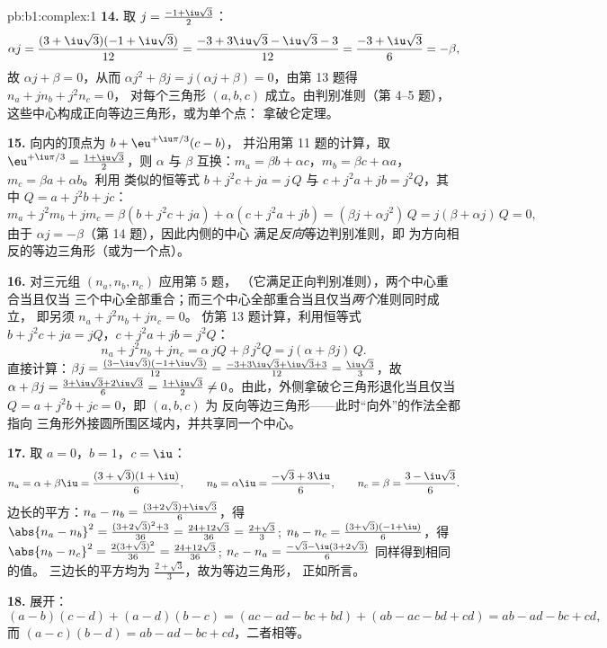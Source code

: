 \begin{solution}{pb:b1:complex:1}
\textbf{14.} 取 $j = \frac{-1 + \iu\sqrt3}2$：
\[
\alpha j = \frac{(3 + \iu\sqrt3)(-1 + \iu\sqrt3)}{12}
= \frac{-3 + 3\iu\sqrt3 - \iu\sqrt3 - 3}{12}
= \frac{-3 + \iu\sqrt3}6 = -\beta ,
\]
故 $\alpha j + \beta = 0$，从而 $\alpha j^2 + \beta j = j(\alpha j
+ \beta) = 0$，由第 13 题得 $n_a + jn_b + j^2n_c = 0$，
对每个三角形 $(a, b, c)$ 成立。由判别准则（第 4--5 题），
这些中心构成正向等边三角形，或为单个点：
拿破仑定理。

\textbf{15.} 向内的顶点为 $b + \eu^{+\iu\pi/3}(c - b)$，
并沿用第 11 题的计算，取 $\eu^{+\iu\pi/3} = \frac{1 +
\iu\sqrt3}2$，则 $\alpha$ 与 $\beta$ 互换：$m_a = \beta b + \alpha
c$，$m_b = \beta c + \alpha a$，$m_c = \beta a + \alpha b$。利用
类似的恒等式 $b + j^2c + ja = j\,Q$ 与 $c + j^2a + jb
= j^2 Q$，其中 $Q = a + j^2b + jc$：
\[
m_a + j^2 m_b + j m_c
= \beta(b + j^2 c + ja) + \alpha(c + j^2 a + jb)
= (\beta j + \alpha j^2)\, Q = j(\beta + \alpha j)\,Q = 0 ,
\]
由于 $\alpha j = -\beta$（第 14 题），因此内侧的中心
满足\emph{反向}等边判别准则，即
为方向相反的等边三角形（或为一个点）。

\textbf{16.} 对三元组 $(n_a, n_b, n_c)$ 应用第 5 题，
（它满足正向判别准则），两个中心重合当且仅当
三个中心全部重合；而三个中心全部重合当且仅当\emph{两个}准则同时成立，
即另须 $n_a + j^2 n_b + j n_c = 0$。
仿第 13 题计算，利用恒等式 $b + j^2c + ja = jQ$，$c + j^2a +
jb = j^2Q$：
\[
n_a + j^2 n_b + j n_c
= \alpha\,jQ + \beta\,j^2 Q = j(\alpha + \beta j)\,Q .
\]
直接计算：$\beta j = \frac{(3 -
\iu\sqrt3)(-1 + \iu\sqrt3)}{12} = \frac{-3 + 3\iu\sqrt3 +
\iu\sqrt3 + 3}{12} = \frac{\iu\sqrt3}3$，故 $\alpha + \beta j =
\frac{3 + \iu\sqrt3 + 2\iu\sqrt3}6 = \frac{1 + \iu\sqrt3}2 \neq
0$。由此，外侧拿破仑三角形退化当且仅当 $Q = a +
j^2b + jc = 0$，即 $(a, b, c)$ 为
反向等边三角形——此时“向外”的作法全都指向
三角形外接圆所围区域内，并共享同一个中心。

\textbf{17.} 取 $a = 0$，$b = 1$，$c = \iu$：
\[
n_a = \alpha + \beta\iu = \frac{(3 + \sqrt3)(1 + \iu)}6,
\qquad
n_b = \alpha\iu = \frac{-\sqrt3 + 3\iu}6,
\qquad
n_c = \beta = \frac{3 - \iu\sqrt3}6 .
\]
边长的平方：$n_a - n_b = \frac{(3 + 2\sqrt3) +
\iu\sqrt3}6$，得 $\abs{n_a - n_b}^2 = \frac{(3 + 2\sqrt3)^2 +
3}{36} = \frac{24 + 12\sqrt3}{36} = \frac{2 + \sqrt3}3$; $n_b -
n_c = \frac{(3 + \sqrt3)(-1 + \iu)}6$，得 $\abs{n_b - n_c}^2 =
\frac{2(3 + \sqrt3)^2}{36} = \frac{24 + 12\sqrt3}{36}$; $n_c - n_a
= \frac{-\sqrt3 - \iu(3 + 2\sqrt3)}6$ 同样得到相同的值。
三边长的平方均为 $\frac{2 + \sqrt3}3$，故为等边三角形，
正如所言。

\textbf{18.} 展开：
\[
(a - b)(c - d) + (a - d)(b - c)
= (ac - ad - bc + bd) + (ab - ac - bd + cd)
= ab - ad - bc + cd ,
\]
而 $(a - c)(b - d) = ab - ad - bc + cd$，二者相等。


\end{solution}
